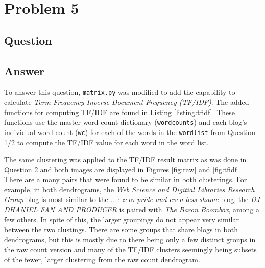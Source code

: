 \section{Problem 5}

\subsection{Question}


\subsection{Answer}

To answer this question, {\tt matrix.py} was modified to add the capability to calculate {\it Term Frequency Inverse Document Frequency (TF/IDF)}. The added functions for computing TF/IDF are found in Listing \ref{listing:tfidf}. These functions use the master word count dictionary ({\tt wordcounts}) and each blog's individual word count ({\tt wc}) for each of the words in the {\tt wordlist} from Question 1/2 to compute the TF/IDF value for each word in the word list. 







The same clustering was applied to the TF/IDF result matrix as was done in Question 2 and both images are displayed in Figures \ref{fig:raw} and \ref{fig:tfidf}.\\

There are a many pairs that were found to be similar in both clusterings. For example, in both dendrograms, the {\it Web Science and Digitial Libraries Research Group} blog is most similar to the {\it ...: zero pride and even less shame} blog, the {\it DJ DHANIEL FAN AND PRODUCER} is paired with {\it The Baron Boombox}, among a few others. In spite of this, the larger groupings do not appear very similar between the two clustings. There are some groups that share blogs in both dendrograms, but this is mostly due to there being only a few distinct groups in the raw count version and many of the TF/IDF clusters seemingly being subsets of the fewer, larger clustering from the raw count dendrogram.\\


